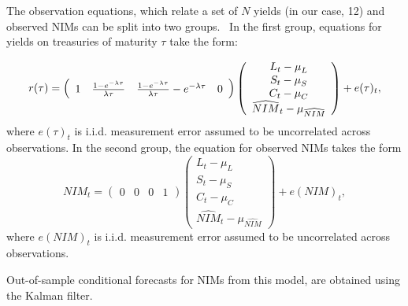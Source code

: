 \documentclass[12pt]{article}
\begin{document}
\bigskip

{\normalsize The observation equations, which relate a set of $N$ yields (in
our case, 12) and observed NIMs can be split into two groups. \ In the first
group, equations for yields on treasuries of maturity }$\tau $ take the form:

\begin{equation*}
r(\tau )=\left(
\begin{array}{cccc}
1 & \frac{1-e^{-\lambda \tau }}{\lambda \tau } & \frac{1-e^{-\lambda \tau }}{%
\lambda \tau }-e^{-\lambda \tau } & 0%
\end{array}%
\right) \left(
\begin{array}{c}
{L_{t}-\mu _{L}} \\
{S_{t}-\mu _{S}} \\
{C_{t}-\mu _{C}} \\
\widehat{NIM}_{t}-\mu _{\widehat{NIM}}%
\end{array}%
\right) +e(\tau )_{t},
\end{equation*}%
where $e(\tau )_{t}$ is i.i.d. measurement error assumed to be uncorrelated
across observations. \bigskip In the second group, the equation for observed
NIMs takes the form%
\begin{equation*}
NIM_{t}=\left(
\begin{array}{cccc}
0 & 0 & 0 & 1%
\end{array}%
\right) \left(
\begin{array}{c}
{L_{t}-\mu _{L}} \\
{S_{t}-\mu _{S}} \\
{C_{t}-\mu _{C}} \\
\widehat{NIM}_{t}-\mu _{\widehat{NIM}}%
\end{array}%
\right) +e(NIM)_{t},
\end{equation*}
where $e(NIM)_{t}$ is i.i.d. measurement error assumed to be uncorrelated
across observations. \bigskip

Out-of-sample conditional forecasts for NIMs from this model, are obtained
using the Kalman filter.
\end{document}
